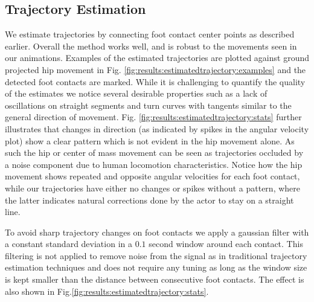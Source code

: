 \subsection{Trajectory Estimation}
We estimate trajectories by connecting foot contact center points as described earlier. Overall the method works well, and is robust to the movements seen in our animations. Examples of the estimated trajectories are plotted against ground projected hip movement in Fig. \ref{fig:results:estimatedtrajectory:examples} and the detected foot contacts are marked. While it is challenging to quantify the quality of the estimates we notice several desirable properties such as a lack of oscillations on straight segments and turn curves with tangents similar to the general direction of movement. Fig. \ref{fig:results:estimatedtrajectory:stats} further illustrates that changes in direction (as indicated by spikes in the angular velocity plot) show a clear pattern  which is not evident in the hip movement alone. As such the hip or center of mass movement can be seen as trajectories occluded by a noise component due to human locomotion characteristics. Notice how the hip movement shows repeated and opposite angular velocities for each foot contact, while our trajectories have either no changes or spikes without a pattern, where the latter indicates natural corrections done by the actor to stay on a straight line. 

To avoid sharp trajectory changes on foot contacts we apply a gaussian filter with a constant standard deviation in a $0.1$ second window around each contact. This filtering is not applied to remove noise from the signal as in traditional trajectory estimation techniques and does not require any tuning as long as the window size is kept smaller than the distance between consecutive foot contacts. The effect is also shown in Fig.\ref{fig:results:estimatedtrajectory:stats}.   


